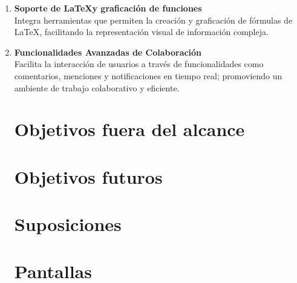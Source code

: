\documentclass[a4paper, oneside, final]{scrartcl}
\begin{document}
\begin{enumerate}
\item \textbf{Soporte de \LaTeX y graficación de funciones}\\
  Integra herramientas que permiten la creación y graficación de fórmulas de
  \LaTeX, facilitando la representación visual de información compleja.

\item \textbf{Funcionalidades Avanzadas de Colaboración}\\
  Facilita la interacción de usuarios a través de funcionalidades como
  comentarios, menciones y notificaciones en tiempo real; promoviendo un
  ambiente de trabajo colaborativo y eficiente.

  \section{Objetivos fuera del alcance}


  \section{Objetivos futuros}
  \section{Suposiciones}

  \section{Pantallas}

\end{enumerate}
\end{document}

